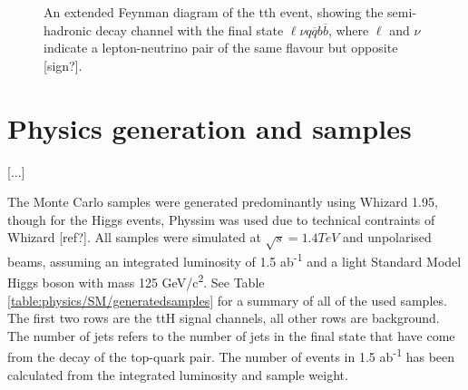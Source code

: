 \begin{figure}
	\caption{An extended Feynman diagram of the tth event, showing the semi-hadronic decay channel  with the final state $\ell\nu q\overline{q}b\overline{b}$, where $\ell$ and $\nu$ indicate a lepton-neutrino pair of the same flavour but opposite [sign?].}
	\label{figure:physics/SM/feynman-tth-semileptonic}
\end{figure}

\section{Physics generation and samples}
[...]

The Monte Carlo samples were generated predominantly using Whizard 1.95, though for the Higgs events, Physsim was used due to technical contraints of Whizard [ref?]. All samples were simulated at $\sqrt{s} = 1.4TeV$ and unpolarised beams, assuming an integrated luminosity of 1.5 ab\textsuperscript{-1} and a light Standard Model Higgs boson with mass 125 GeV/c\textsuperscript{2}. See Table \ref{table:physics/SM/generatedsamples} for a summary of all of the used samples. The first two rows are the ttH signal channels, all other rows are background. The number of jets refers to the number of jets in the final state that have come from the decay of the top-quark pair. The number of events in 1.5 ab\textsuperscript{-1} has been calculated from the integrated luminosity and sample weight.

